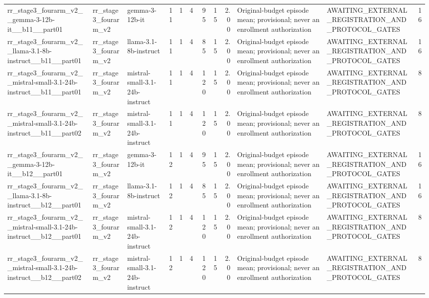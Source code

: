 \begin{tabular}{lllrrrrrrllr}
rr\_stage3\_fourarm\_v2\_\_gemma-3-12b-it\_\_b11\_\_part01 & rr\_stage3\_fourarm\_v2 & gemma-3-12b-it & 11 & 1 & 4 & 95 & 15 & 2.00 & Original-budget episode mean; provisional; never an enrollment authorization & AWAITING\_EXTERNAL\_REGISTRATION\_AND\_PROTOCOL\_GATES & 16 \\
rr\_stage3\_fourarm\_v2\_\_llama-3.1-8b-instruct\_\_b11\_\_part01 & rr\_stage3\_fourarm\_v2 & llama-3.1-8b-instruct & 11 & 1 & 4 & 85 & 15 & 2.00 & Original-budget episode mean; provisional; never an enrollment authorization & AWAITING\_EXTERNAL\_REGISTRATION\_AND\_PROTOCOL\_GATES & 16 \\
rr\_stage3\_fourarm\_v2\_\_mistral-small-3.1-24b-instruct\_\_b11\_\_part01 & rr\_stage3\_fourarm\_v2 & mistral-small-3.1-24b-instruct & 11 & 1 & 4 & 120 & 15 & 2.00 & Original-budget episode mean; provisional; never an enrollment authorization & AWAITING\_EXTERNAL\_REGISTRATION\_AND\_PROTOCOL\_GATES & 8 \\
rr\_stage3\_fourarm\_v2\_\_mistral-small-3.1-24b-instruct\_\_b11\_\_part02 & rr\_stage3\_fourarm\_v2 & mistral-small-3.1-24b-instruct & 11 & 1 & 4 & 120 & 15 & 2.00 & Original-budget episode mean; provisional; never an enrollment authorization & AWAITING\_EXTERNAL\_REGISTRATION\_AND\_PROTOCOL\_GATES & 8 \\
rr\_stage3\_fourarm\_v2\_\_gemma-3-12b-it\_\_b12\_\_part01 & rr\_stage3\_fourarm\_v2 & gemma-3-12b-it & 12 & 1 & 4 & 95 & 15 & 2.00 & Original-budget episode mean; provisional; never an enrollment authorization & AWAITING\_EXTERNAL\_REGISTRATION\_AND\_PROTOCOL\_GATES & 16 \\
rr\_stage3\_fourarm\_v2\_\_llama-3.1-8b-instruct\_\_b12\_\_part01 & rr\_stage3\_fourarm\_v2 & llama-3.1-8b-instruct & 12 & 1 & 4 & 85 & 15 & 2.00 & Original-budget episode mean; provisional; never an enrollment authorization & AWAITING\_EXTERNAL\_REGISTRATION\_AND\_PROTOCOL\_GATES & 16 \\
rr\_stage3\_fourarm\_v2\_\_mistral-small-3.1-24b-instruct\_\_b12\_\_part01 & rr\_stage3\_fourarm\_v2 & mistral-small-3.1-24b-instruct & 12 & 1 & 4 & 120 & 15 & 2.00 & Original-budget episode mean; provisional; never an enrollment authorization & AWAITING\_EXTERNAL\_REGISTRATION\_AND\_PROTOCOL\_GATES & 8 \\
rr\_stage3\_fourarm\_v2\_\_mistral-small-3.1-24b-instruct\_\_b12\_\_part02 & rr\_stage3\_fourarm\_v2 & mistral-small-3.1-24b-instruct & 12 & 1 & 4 & 120 & 15 & 2.00 & Original-budget episode mean; provisional; never an enrollment authorization & AWAITING\_EXTERNAL\_REGISTRATION\_AND\_PROTOCOL\_GATES & 8 \\
\bottomrule
\end{tabular}
